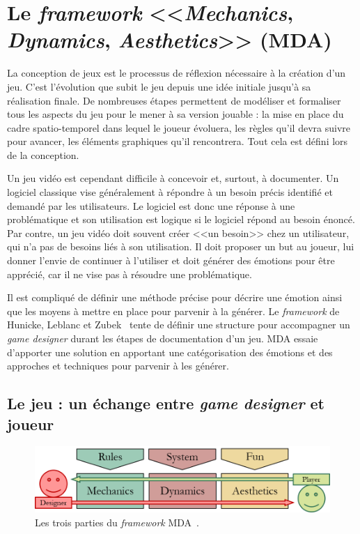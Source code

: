 \chapter{Le \emph{framework} <<\emph{Mechanics}, \emph{Dynamics}, \emph{Aesthetics}>> (MDA)}
\label{chap.MDA}


La conception de jeux est le processus de réflexion nécessaire à la création d'un jeu.
C'est l'évolution que subit le jeu depuis une idée initiale jusqu'à sa réalisation finale.
De nombreuses étapes permettent de modéliser et formaliser tous les aspects du jeu pour le mener à sa version jouable : 
la mise en place du cadre spatio-temporel dans lequel le joueur évoluera, les règles qu'il devra suivre pour avancer, les éléments graphiques qu'il rencontrera. Tout cela est défini lors de la conception. 

Un jeu vidéo est cependant difficile à concevoir et, surtout, à documenter.
Un logiciel classique vise généralement \`a répondre à un besoin précis identifié et demandé par les utilisateurs.
Le logiciel est donc une réponse à une problématique et son utilisation est logique si le logiciel répond au besoin énoncé.
%
Par contre, un jeu vidéo doit souvent créer <<un besoin>> chez un utilisateur, qui n'a pas de besoins liés à son utilisation.
Il doit proposer un but au joueur, lui donner l'envie de continuer à l'utiliser et doit générer des émotions pour être apprécié, car il ne vise pas \`a r\'esoudre une problématique.

Il est compliqué de définir une méthode précise pour décrire une émotion ainsi que les moyens à mettre en place pour parvenir à la générer.
Le \emph{framework}  de Hunicke, Leblanc et Zubek~\cite{MDA_formal} tente de définir une structure pour accompagner un \emph{game designer} durant les étapes de documentation d'un jeu.
MDA essaie d'apporter une solution en apportant une catégorisation des émotions et des approches et techniques pour parvenir à les générer.


\section{Le jeu : un échange entre \emph{game designer} et joueur}




\begin{figure}
    \begin{center}
    \includegraphics[width=14cm]{10_img/chap3/mda.png} 
    \caption{Les trois parties du \emph{framework} MDA~\cite{MDA_formal}.}
    \label{fig:mda}
    \end{center}
\end{figure}

